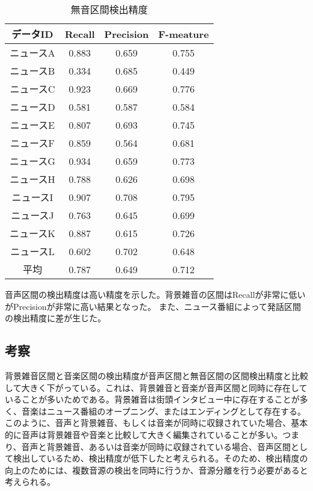 \begin{table}[H]
  \begin{center}
    \caption{無音区間検出精度 \label{table:NHK_pause_RPF}}
    \begin{tabular}{|c||c|c|c|} \hline
データID & Recall & Precision & F-meature \\ \hline
ニュースA & 0.883 & 0.659 & 0.755 \\ \hline
ニュースB & 0.334 & 0.685 & 0.449 \\ \hline
ニュースC & 0.923 & 0.669 & 0.776 \\ \hline
ニュースD & 0.581 & 0.587 & 0.584 \\ \hline
ニュースE & 0.807 & 0.693 & 0.745 \\ \hline
ニュースF & 0.859 & 0.564 & 0.681 \\ \hline
ニュースG & 0.934 & 0.659 & 0.773 \\ \hline
ニュースH & 0.788 & 0.626 & 0.698 \\ \hline
ニュースI & 0.907 & 0.708 & 0.795 \\ \hline
ニュースJ & 0.763 & 0.645 & 0.699 \\ \hline
ニュースK & 0.887 & 0.615 & 0.726 \\ \hline
ニュースL & 0.602 & 0.702 & 0.648 \\ \hline
 平均 & 0.787 & 0.649 & 0.712 \\ \hline
    \end{tabular}
  \end{center}
\end{table}


音声区間の検出精度は高い精度を示した。背景雑音の区間はRecallが非常に低いがPrecisionが非常に高い結果となった。
また、ニュース番組によって発話区間の検出精度に差が生じた。

\subsection{考察}
背景雑音区間と音楽区間の検出精度が音声区間と無音区間の区間検出精度と比較して大きく下がっている。これは、背景雑音と音楽が音声区間と同時に存在していることが多いためである。背景雑音は街頭インタビュー中に存在することが多く、音楽はニュース番組のオープニング、またはエンディングとして存在する。このように、音声と背景雑音、もしくは音楽が同時に収録されていた場合、基本的に音声は背景雑音や音楽と比較して大きく編集されていることが多い。つまり、音声と背景雑音、あるいは音楽が同時に収録されている場合、音声区間として検出しているため、検出精度が低下したと考えられる。そのため、検出精度の向上のためには、複数音源の検出を同時に行うか、音源分離を行う必要があると考えられる。\par